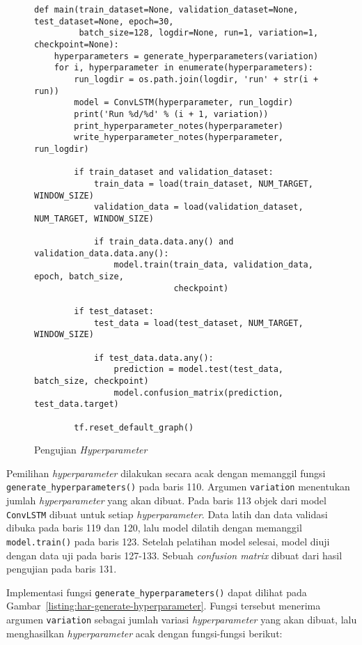 \begin{figure}[h]
\begin{verbatim}
def main(train_dataset=None, validation_dataset=None, test_dataset=None, epoch=30,
         batch_size=128, logdir=None, run=1, variation=1, checkpoint=None):
    hyperparameters = generate_hyperparameters(variation)
    for i, hyperparameter in enumerate(hyperparameters):
        run_logdir = os.path.join(logdir, 'run' + str(i + run))
        model = ConvLSTM(hyperparameter, run_logdir)
        print('Run %d/%d' % (i + 1, variation))
        print_hyperparameter_notes(hyperparameter)
        write_hyperparameter_notes(hyperparameter, run_logdir)

        if train_dataset and validation_dataset:
            train_data = load(train_dataset, NUM_TARGET, WINDOW_SIZE)
            validation_data = load(validation_dataset, NUM_TARGET, WINDOW_SIZE)

            if train_data.data.any() and validation_data.data.any():
                model.train(train_data, validation_data, epoch, batch_size,
                            checkpoint)

        if test_dataset:
            test_data = load(test_dataset, NUM_TARGET, WINDOW_SIZE)

            if test_data.data.any():
                prediction = model.test(test_data, batch_size, checkpoint)
                model.confusion_matrix(prediction, test_data.target)

        tf.reset_default_graph()
\end{verbatim}
\caption{Pengujian \textit{Hyperparameter}}
\label{listing:har-pengujian-hyperparameter}
\end{figure}

Pemilihan \textit{hyperparameter} dilakukan secara acak dengan memanggil fungsi \texttt{generate_hyperparameters()} pada baris 110. Argumen \texttt{variation} menentukan jumlah \textit{hyperparameter} yang akan dibuat. Pada baris 113 objek dari model \texttt{ConvLSTM} dibuat untuk setiap \textit{hyperparameter}. Data latih dan data validasi dibuka pada baris 119 dan 120, lalu model dilatih dengan memanggil \texttt{model.train()} pada baris 123. Setelah pelatihan model selesai, model diuji dengan data uji pada baris 127-133. Sebuah \textit{confusion matrix} dibuat dari hasil pengujian pada baris 131.

Implementasi fungsi \texttt{generate_hyperparameters()} dapat dilihat pada Gambar~\ref{listing:har-generate-hyperparameter}. Fungsi tersebut menerima argumen \texttt{variation} sebagai jumlah variasi \textit{hyperparameter} yang akan dibuat, lalu menghasilkan \textit{hyperparameter} acak dengan fungsi-fungsi berikut:

